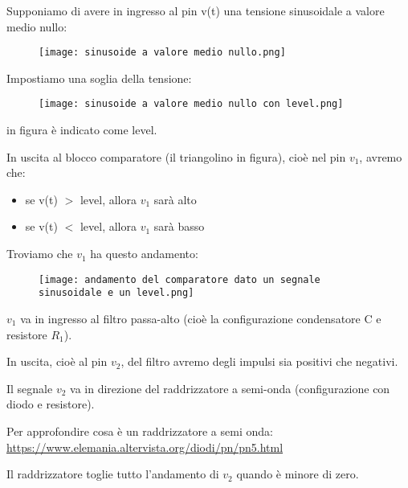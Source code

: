 Supponiamo di avere in ingresso al pin v(t) una tensione sinusoidale a valore medio nullo: 

\begin{figure}[h]
    \centering
    \texttt{[image: sinusoide a valore medio nullo.png]}
\end{figure}

Impostiamo una soglia della tensione: 

\begin{figure}[h]
    \centering
    \texttt{[image: sinusoide a valore medio nullo con level.png]}
\end{figure}

in figura è indicato come level. \newline 

In uscita al blocco comparatore (il triangolino in figura), cioè nel pin $v_1$, 
avremo che: 

\begin{itemize}
    \item se v(t) $>$ level, allora $v_1$ sarà alto 
    \item se v(t) $<$ level, allora $v_1$ sarà basso 
\end{itemize}

Troviamo che $v_1$ ha questo andamento: 

\begin{figure}[h]
    \centering
    \texttt{[image: andamento del comparatore dato un segnale sinusoidale e un level.png]}
\end{figure}

\newpage 

$v_1$ va in ingresso al filtro passa-alto (cioè la configurazione condensatore C e resistore $R_1$). \newline 

In uscita, cioè al pin $v_2$, del filtro avremo degli impulsi sia positivi che negativi. \newline 

Il segnale $v_2$ va in direzione del raddrizzatore a semi-onda (configurazione con diodo e resistore). \newline 

\begin{tcolorbox}
    Per approfondire cosa è un raddrizzatore a semi onda: \\
    \url{https://www.elemania.altervista.org/diodi/pn/pn5.html}
\end{tcolorbox}

Il raddrizzatore toglie tutto l'andamento di $v_2$ quando è minore di zero. \newline 

